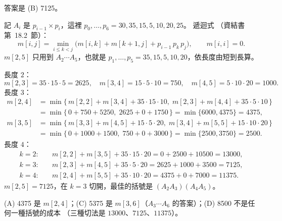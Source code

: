 \begin{pastsoln}
答案是 (B) 7125。

記 $A_i$ 是 $p_{i-1} \times p_i$，這裡 $p_0, \ldots, p_6 = 30, 35, 15, 5, 10, 20, 25$。 遞迴式
（資結書第~18.2~節）：
\[
m[i, j] = \min_{i \le k < j} \bigl( m[i, k] + m[k+1, j] + p_{i-1}\, p_k\, p_j \bigr), \qquad m[i, i] = 0.
\]
$m[2, 5]$ 只用到 $A_2 \cdots A_5$，也就是 $p_1, \ldots, p_5 = 35, 15, 5, 10, 20$，依長度由短到長算。

長度 $2$：
\[
m[2,3] = 35 \cdot 15 \cdot 5 = 2625, \quad m[3,4] = 15 \cdot 5 \cdot 10 = 750, \quad
m[4,5] = 5 \cdot 10 \cdot 20 = 1000.
\]
長度 $3$：
\begin{align*}
m[2,4] &= \min\{\, m[2,2] + m[3,4] + 35 \cdot 15 \cdot 10,\; m[2,3] + m[4,4] + 35 \cdot 5 \cdot 10 \,\} \\
       &= \min\{\, 0 + 750 + 5250,\; 2625 + 0 + 1750 \,\} = \min\{6000, 4375\} = 4375, \\
m[3,5] &= \min\{\, m[3,3] + m[4,5] + 15 \cdot 5 \cdot 20,\; m[3,4] + m[5,5] + 15 \cdot 10 \cdot 20 \,\} \\
       &= \min\{\, 0 + 1000 + 1500,\; 750 + 0 + 3000 \,\} = \min\{2500, 3750\} = 2500.
\end{align*}
長度 $4$：
\begin{align*}
k = 2:&\quad m[2,2] + m[3,5] + 35 \cdot 15 \cdot 20 = 0 + 2500 + 10500 = 13000, \\
k = 3:&\quad m[2,3] + m[4,5] + 35 \cdot 5 \cdot 20 = 2625 + 1000 + 3500 = 7125, \\
k = 4:&\quad m[2,4] + m[5,5] + 35 \cdot 10 \cdot 20 = 4375 + 0 + 7000 = 11375.
\end{align*}
$m[2,5] = 7125$，在 $k = 3$ 切開，最佳的括號是 $(A_2 A_3)(A_4 A_5)$。

(A) 4375 是 $m[2,4]$；(C) 5375 是 $m[3,6]$（$A_3 \cdots A_6$ 的答案）；(D) 8500 不是任何一種括號的成本
（三種切法是 $13000$、$7125$、$11375$）。
\end{pastsoln}
